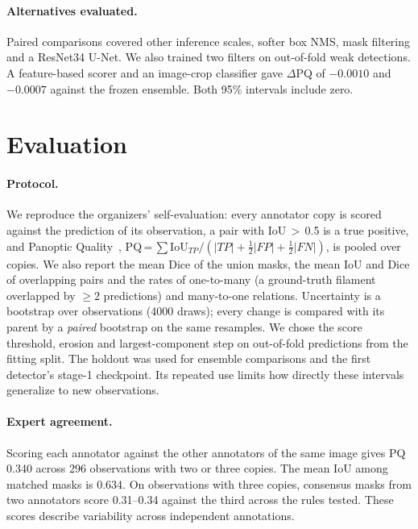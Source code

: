 \documentclass[sigconf]{acmart}
\begin{document}
\paragraph{Alternatives evaluated.}
Paired comparisons covered other inference scales, softer box NMS, mask filtering and a ResNet34 U-Net. We also trained two filters on out-of-fold weak detections. A feature-based scorer and an image-crop classifier gave $\Delta$PQ of $-0.0010$ and $-0.0007$ against the frozen ensemble. Both 95\% intervals include zero.

\section{Evaluation}
\paragraph{Protocol.}
We reproduce the organizers' self-evaluation: every annotator copy is scored against the prediction of its observation, a pair with IoU\,$>$\,0.5 is a true positive, and Panoptic Quality~\cite{pq}, PQ\,=\,$\sum \mathrm{IoU}_{TP}/(|TP|+\tfrac12|FP|+\tfrac12|FN|)$, is pooled over copies. We also report the mean Dice of the union masks, the mean IoU and Dice of overlapping pairs and the rates of one-to-many (a ground-truth filament overlapped by $\ge2$ predictions) and many-to-one relations. Uncertainty is a bootstrap over observations (4000 draws); every change is compared with its parent by a \emph{paired} bootstrap on the same resamples. We chose the score threshold, erosion and largest-component step on out-of-fold predictions from the fitting split. The holdout was used for ensemble comparisons and the first detector's stage-1 checkpoint. Its repeated use limits how directly these intervals generalize to new observations.

\paragraph{Expert agreement.}
Scoring each annotator against the other annotators of the same image gives PQ 0.340 across 296 observations with two or three copies. The mean IoU among matched masks is 0.634. On observations with three copies, consensus masks from two annotators score 0.31--0.34 against the third across the rules tested. These scores describe variability across independent annotations.
\end{document}
